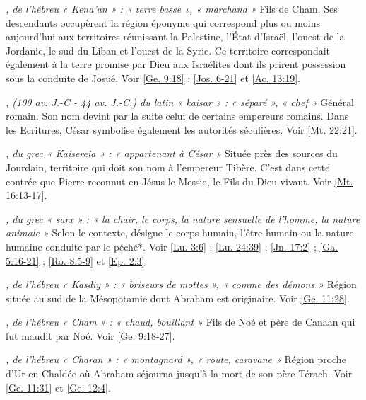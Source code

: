 \begin{multicols}{2}
\textit{, de l'hébreu « Kena'an » : « terre basse », « marchand »}\newline
Fils de Cham. Ses descendants occupèrent la région éponyme qui correspond plus ou moins aujourd'hui aux territoires réunissant la Palestine, l'État d'Israël, l'ouest de la Jordanie, le sud du Liban et l'ouest de la Syrie. Ce territoire correspondait également à la terre promise par Dieu aux Israélites dont ils prirent possession sous la conduite de Josué. Voir \vref{Ge. 9:18} ; \vref{Jos. 6-21} et \vref{Ac. 13:19}.

\textit{, (100 av. J.-C - 44 av. J.-C.) du latin « kaisar » : « séparé », « chef »}\newline
Général romain. Son nom devint par la suite celui de certains empereurs romains. Dans les Ecritures, César symbolise également les autorités séculières. Voir \vref{Mt. 22:21}.

\textit{, du grec « Kaisereia » : « appartenant à César »}\newline
Située près des sources du Jourdain, territoire qui doit son nom à l'empereur Tibère. C'est dans cette contrée que Pierre reconnut en Jésus le Messie, le Fils du Dieu vivant. Voir \vref{Mt. 16:13-17}.

\textit{, du grec « sarx » : « la chair, le corps, la nature sensuelle de l'homme, la nature animale »}\newline
Selon le contexte, désigne le corps humain, l'être humain ou la nature humaine conduite par le péché*. Voir \vref{Lu. 3:6} ; \vref{Lu. 24:39} ; \vref{Jn. 17:2} ; \vref{Ga. 5:16-21} ; \vref{Ro. 8:5-9} et \vref{Ep. 2:3}.

\textit{, de l'hébreu « Kasdiy » : « briseurs de mottes », « comme des démons »}\newline
Région située au sud de la Mésopotamie dont Abraham est originaire. Voir \vref{Ge. 11:28}.

\textit{, de l'hébreu « Cham » : « chaud, bouillant »}\newline
Fils de Noé et père de Canaan qui fut maudit par Noé. Voir \vref{Ge. 9:18-27}.

\textit{, de l'hébreu « Charan » : « montagnard », « route, caravane »}\newline
Région proche d'Ur en Chaldée où Abraham séjourna jusqu'à la mort de son père Térach. Voir \vref{Ge. 11:31} et \vref{Ge. 12:4}.


\end{multicols}
